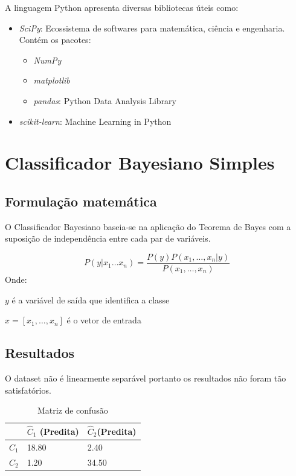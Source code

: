 \documentclass[11pt,a4paper]{article}
\numberwithin{equation}{section}
\begin{document}
A linguagem Python apresenta diversas bibliotecas úteis como:
\begin{itemize}
\item \textit{SciPy}: Ecossistema de softwares para matemática, ciência e engenharia. Contém os pacotes:
\begin{itemize}
\item \textit{NumPy}
\item \textit{matplotlib}
\item \textit{pandas}: Python Data Analysis Library
\end{itemize}
\item \textit{scikit-learn}: Machine Learning in Python
\end{itemize}


\section{Classificador Bayesiano Simples}

\subsection{Formulação matemática}
O Classificador Bayesiano baseia-se na aplicação do Teorema de Bayes com a suposição de independência entre cada par de variáveis. 

\[P(y|x_1 \dots x_n)  = \frac{P(y)P(x_1, \dots, x_n|y)}{P(x_1,\dots, x_n)}\]
Onde:

$y$ é a variável de saída que identifica a classe

$x = [x_1, \dots, x_n] $ é o vetor de entrada 

\subsection{Resultados}
O dataset não é linearmente separável portanto os resultados não foram tão satisfatórios.

\begin{table}[H]
\centering
\caption{Matriz de confusão}
\begin{tabular}{l l l}
\hline
 & \textbf{$\hat{C}_1$ (Predita)} & \textbf{$\hat{C}_2$(Predita)}\\
\hline
$C_1$ & 18.80&2.40\\ 
$C_2$ &  1.20&34.50\\ 
\hline
\end{tabular}
\end{table}
\end{document}
